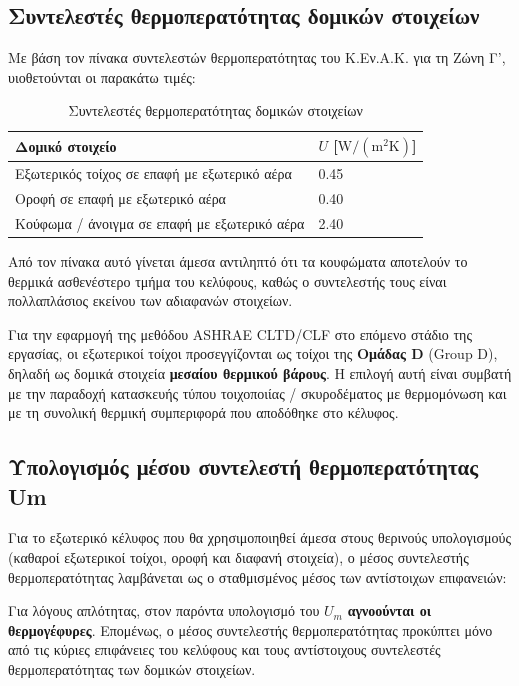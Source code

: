 \documentclass[12pt,a4paper]{article}
\begin{document}
\subsection{Συντελεστές θερμοπερατότητας δομικών στοιχείων}

Με βάση τον πίνακα συντελεστών θερμοπερατότητας του Κ.Εν.Α.Κ. για τη Ζώνη Γ',
υιοθετούνται οι παρακάτω τιμές:

\begin{table}[H]
\centering
\caption{Συντελεστές θερμοπερατότητας δομικών στοιχείων}
\begin{tabularx}{\textwidth}{L C{3.4cm}}
\toprule
\textbf{Δομικό στοιχείο} & \textbf{\(U\) [\(\mathrm{W/(m^2K)}\)]} \\
\midrule
Εξωτερικός τοίχος σε επαφή με εξωτερικό αέρα & 0.45 \\
Οροφή σε επαφή με εξωτερικό αέρα & 0.40 \\
Κούφωμα / άνοιγμα σε επαφή με εξωτερικό αέρα & 2.40 \\
\bottomrule
\end{tabularx}
\end{table}

Από τον πίνακα αυτό γίνεται άμεσα αντιληπτό ότι τα κουφώματα αποτελούν το θερμικά
ασθενέστερο τμήμα του κελύφους, καθώς ο συντελεστής τους είναι πολλαπλάσιος εκείνου
των αδιαφανών στοιχείων.

Για την εφαρμογή της μεθόδου \textenglish{ASHRAE CLTD/CLF} στο επόμενο στάδιο της
εργασίας, οι εξωτερικοί τοίχοι προσεγγίζονται ως τοίχοι της \textbf{Ομάδας D}
(\textenglish{Group D}), δηλαδή ως δομικά στοιχεία \textbf{μεσαίου θερμικού βάρους}.
Η επιλογή αυτή είναι συμβατή με την παραδοχή κατασκευής τύπου τοιχοποιίας / σκυροδέματος
με θερμομόνωση και με τη συνολική θερμική συμπεριφορά που αποδόθηκε στο κέλυφος.

\subsection{Υπολογισμός μέσου συντελεστή θερμοπερατότητας Um}

Για το εξωτερικό κέλυφος που θα χρησιμοποιηθεί άμεσα στους θερινούς υπολογισμούς
(καθαροί εξωτερικοί τοίχοι, οροφή και διαφανή στοιχεία), ο μέσος συντελεστής
θερμοπερατότητας λαμβάνεται ως ο σταθμισμένος μέσος των αντίστοιχων επιφανειών:

Για λόγους απλότητας, στον παρόντα υπολογισμό του \(U_m\) \textbf{αγνοούνται οι
θερμογέφυρες}. Επομένως, ο μέσος συντελεστής θερμοπερατότητας προκύπτει μόνο από
τις κύριες επιφάνειες του κελύφους και τους αντίστοιχους συντελεστές
θερμοπερατότητας των δομικών στοιχείων.
\end{document}
